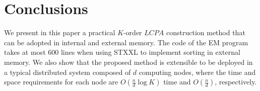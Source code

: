 \documentclass{llncs}
\begin{document}
\section{Conclusions}\label{sec:conclusion}

We present in this paper a practical $K$-order $LCPA$ construction method that can be adopted in internal and external memory. The code of the {EM} program takes at most 600 lines when using {STXXL} to implement sorting in external memory. We also show that the proposed method is extensible to be deployed in a typical distributed system composed of $d$ computing nodes, where the time and space requirements for each node are $O(\frac{n}{d}\log K)$ time and $O(\frac{n}{d})$, respectively.



\end{document}
